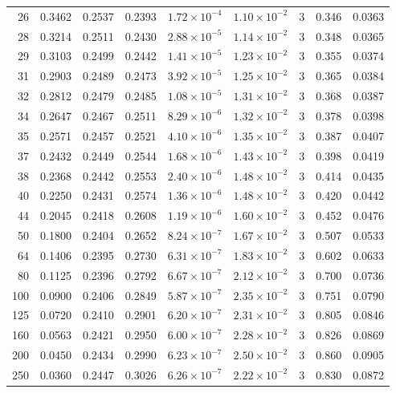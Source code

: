 \documentclass[11pt,letterpaper]{article}
\begin{document}
\begin{small}
\begin{longtable}{rrrrrrrrr}
26 & 0.3462 & 0.2537 & 0.2393 & $1.72\times10^{-4}$ & $1.10\times10^{-2}$ & 3 & 0.346 & 0.0363 \\
28 & 0.3214 & 0.2511 & 0.2430 & $2.88\times10^{-5}$ & $1.14\times10^{-2}$ & 3 & 0.348 & 0.0365 \\
29 & 0.3103 & 0.2499 & 0.2442 & $1.41\times10^{-5}$ & $1.23\times10^{-2}$ & 3 & 0.355 & 0.0374 \\
31 & 0.2903 & 0.2489 & 0.2473 & $3.92\times10^{-5}$ & $1.25\times10^{-2}$ & 3 & 0.365 & 0.0384 \\
32 & 0.2812 & 0.2479 & 0.2485 & $1.08\times10^{-5}$ & $1.31\times10^{-2}$ & 3 & 0.368 & 0.0387 \\
34 & 0.2647 & 0.2467 & 0.2511 & $8.29\times10^{-6}$ & $1.32\times10^{-2}$ & 3 & 0.378 & 0.0398 \\
35 & 0.2571 & 0.2457 & 0.2521 & $4.10\times10^{-6}$ & $1.35\times10^{-2}$ & 3 & 0.387 & 0.0407 \\
37 & 0.2432 & 0.2449 & 0.2544 & $1.68\times10^{-6}$ & $1.43\times10^{-2}$ & 3 & 0.398 & 0.0419 \\
38 & 0.2368 & 0.2442 & 0.2553 & $2.40\times10^{-6}$ & $1.48\times10^{-2}$ & 3 & 0.414 & 0.0435 \\
40 & 0.2250 & 0.2431 & 0.2574 & $1.36\times10^{-6}$ & $1.48\times10^{-2}$ & 3 & 0.420 & 0.0442 \\
44 & 0.2045 & 0.2418 & 0.2608 & $1.19\times10^{-6}$ & $1.60\times10^{-2}$ & 3 & 0.452 & 0.0476 \\
50 & 0.1800 & 0.2404 & 0.2652 & $8.24\times10^{-7}$ & $1.67\times10^{-2}$ & 3 & 0.507 & 0.0533 \\
64 & 0.1406 & 0.2395 & 0.2730 & $6.31\times10^{-7}$ & $1.83\times10^{-2}$ & 3 & 0.602 & 0.0633 \\
80 & 0.1125 & 0.2396 & 0.2792 & $6.67\times10^{-7}$ & $2.12\times10^{-2}$ & 3 & 0.700 & 0.0736 \\
100 & 0.0900 & 0.2406 & 0.2849 & $5.87\times10^{-7}$ & $2.35\times10^{-2}$ & 3 & 0.751 & 0.0790 \\
125 & 0.0720 & 0.2410 & 0.2901 & $6.20\times10^{-7}$ & $2.31\times10^{-2}$ & 3 & 0.805 & 0.0846 \\
160 & 0.0563 & 0.2421 & 0.2950 & $6.00\times10^{-7}$ & $2.28\times10^{-2}$ & 3 & 0.826 & 0.0869 \\
200 & 0.0450 & 0.2434 & 0.2990 & $6.23\times10^{-7}$ & $2.50\times10^{-2}$ & 3 & 0.860 & 0.0905 \\
250 & 0.0360 & 0.2447 & 0.3026 & $6.26\times10^{-7}$ & $2.22\times10^{-2}$ & 3 & 0.830 & 0.0872 \\

\end{longtable}
\end{small}
\end{document}
